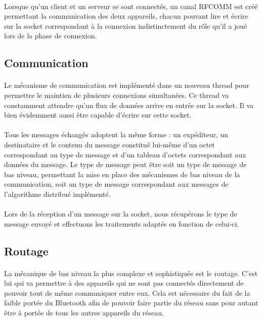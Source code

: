 \documentclass[a4paper,10pt]{report}
\begin{document}
    \paragraph{}
    Lorsque qu'un client et un serveur se sont connectés, un canal RFCOMM est créé permettant la communication des deux appareils, chacun pouvant lire et écrire sur la socket correspondant à la connexion indistinctement du rôle qu'il a joué lors de la phase de connexion.
    
    \subsection{Communication}
    \paragraph{}
    Le mécanisme de communication est implémenté dans un nouveau thread pour permettre le maintien de plusieurs connexions simultanées. Ce thread va constamment attendre qu'un flux de données arrive en entrée sur la socket. Il va bien évidemment aussi être capable d'écrire sur cette socket.
    \paragraph{}
    Tous les messages échangés adoptent la même forme : un expéditeur, un destinataire et le contenu du message constitué lui-même d'un octet correspondant au type de message et d'un tableau d'octets correspondant aux données du message. Le type de message peut être soit un type de message de bas niveau, permettant la mise en place des mécanismes de bas niveau de la communication, soit un type de message correspondant aux messages de l'algorithme distribué implémenté.
    \paragraph{}
    Lors de la réception d'un message sur la socket, nous récupérons le type de message envoyé et effectuons les traitements adaptés en fonction de celui-ci.
    
    \subsection{Routage}
    \paragraph{}
    La mécanique de bas niveau la plus complexe et sophistiquée est le routage. C'est lui qui va permettre à des appareils qui ne sont pas connectés directement de pouvoir tout de même communiquer entre eux. Cela est nécessaire du fait de la faible portée du Bluetooth afin de pouvoir faire partie du réseau sans pour autant être à portée de tous les autres appareils du réseau.
\end{document}
